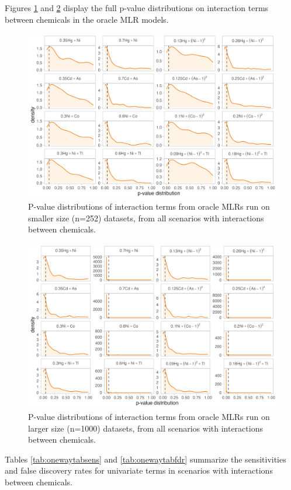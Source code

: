 \documentclass[12pt, twoside]{amherstthesis}
\begin{document}
Figures \ref{fig:osmbivp} and \ref{fig:olgbivp} display the full p-value distributions on interaction terms between chemicals in the oracle MLR models.
\begin{figure}

{\centering \includegraphics[width=0.85\linewidth]{figures/ch4_osm_biv_pval} 

}

\caption{P-value distributions of interaction terms from oracle MLRs run on smaller size (n=252) datasets, from all scenarios with interactions between chemicals.}\label{fig:osmbivp}
\end{figure}
\begin{figure}

{\centering \includegraphics[width=0.85\linewidth]{figures/ch4_olg_biv_pval} 

}

\caption{P-value distributions of interaction terms from oracle MLRs run on larger size (n=1000) datasets, from all scenarios with interactions between chemicals.}\label{fig:olgbivp}
\end{figure}
Tables \ref{tab:onewaytabsens} and \ref{tab:onewaytabfdr} summarize the sensitivities and false discovery rates for univariate terms in scenarios with interactions between chemicals.
\end{document}
